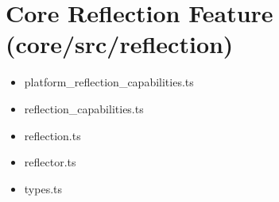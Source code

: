 \section{Core Reflection Feature (core/src/reflection)}


\begin{itemize}
  \item platform\_reflection\_capabilities.ts
  \item reflection\_capabilities.ts
  \item reflection.ts
  \item reflector.ts
  \item types.ts
\end{itemize}












